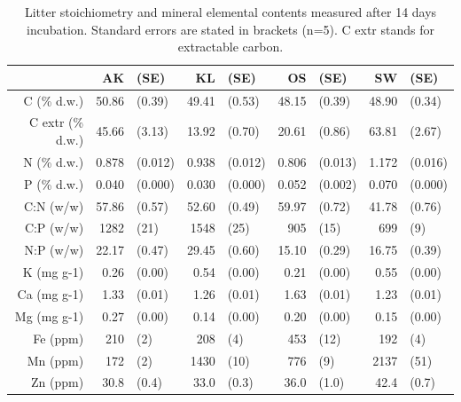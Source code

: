 \documentclass[authoryear,preprint,review,12pt]{elsarticle}
\begin{document}
\newpage
\begin{table}[h!]
\begin{center}
\caption{Litter stoichiometry and mineral elemental contents measured after 14 days incubation. Standard errors are stated in brackets (n=5). C extr stands for extractable carbon.}
\label{initstoech}
{\tiny
\begin{tabular}{rrlrlrlrl}
  \hline
 & AK & (SE) & KL & (SE) & OS & (SE) & SW & (SE) \\ 
  \hline
C (\% d.w.) & 50.86 & (0.39) & 49.41 & (0.53) & 48.15 & (0.39) & 48.90 & (0.34) \\ 
  C extr (\% d.w.) & 45.66 & (3.13) & 13.92 & (0.70) & 20.61 & (0.86) & 63.81 & (2.67) \\ 
  N (\% d.w.) & 0.878 &  (0.012) & 0.938 &  (0.012) & 0.806 &  (0.013) & 1.172 &  (0.016) \\ 
  P (\% d.w.) & 0.040 & (0.000) & 0.030 & (0.000) & 0.052 & (0.002) & 0.070 & (0.000) \\ 
  C:N (w/w) & 57.86 &  (0.57) & 52.60 &  (0.49) & 59.97 &  (0.72) & 41.78 &  (0.76) \\ 
  C:P (w/w) & 1282 & (21) & 1548 & (25) & 905 & (15) & 699 & (9) \\ 
  N:P (w/w) & 22.17 & (0.47) & 29.45 & (0.60) & 15.10 & (0.29) & 16.75 & (0.39) \\ 
  K (mg g-1) & 0.26 & (0.00) & 0.54 & (0.00) & 0.21 & (0.00) & 0.55 & (0.00) \\ 
  Ca (mg g-1) & 1.33 & (0.01) & 1.26 & (0.01) & 1.63 & (0.01) & 1.23 & (0.01) \\ 
  Mg (mg g-1) & 0.27 &  (0.00) & 0.14 &  (0.00) & 0.20 &  (0.00) & 0.15 &  (0.00) \\ 
  Fe (ppm) & 210 & (2) & 208 & (4) & 453 & (12) & 192 & (4) \\ 
  Mn (ppm) & 172 &  (2) & 1430 &  (10) & 776 &  (9) & 2137 &  (51) \\ 
  Zn (ppm) & 30.8 & (0.4) & 33.0 & (0.3) & 36.0 & (1.0) & 42.4 & (0.7) \\ 
   \hline
\end{tabular}
}
\end{center}
\end{table}
\newpage
\end{document}
